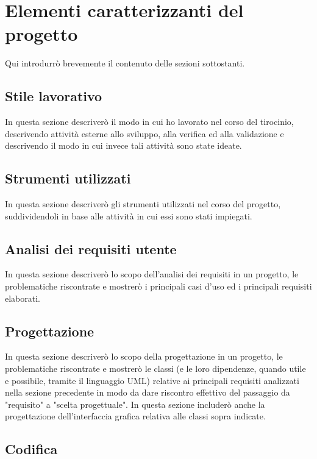 \chapter{Elementi caratterizzanti del progetto}
\label{cap:elementi-progetto}
Qui introdurrò brevemente il contenuto delle sezioni sottostanti.

\section{Stile lavorativo}

In questa sezione descriverò il modo in cui ho lavorato nel corso del tirocinio, descrivendo attività esterne allo sviluppo, alla verifica ed alla validazione e descrivendo il modo in cui invece tali attività sono state ideate.

\section{Strumenti utilizzati}

In questa sezione descriverò gli strumenti utilizzati nel corso del progetto, suddividendoli in base alle attività in cui essi sono stati impiegati.

\section{Analisi dei requisiti utente}

In questa sezione descriverò lo scopo dell'analisi dei requisiti in un progetto, le problematiche riscontrate e mostrerò i principali casi d'uso ed i principali requisiti elaborati.

\section{Progettazione}

In questa sezione descriverò lo scopo della progettazione in un progetto, le problematiche riscontrate e mostrerò le classi (e le loro dipendenze, quando utile e possibile, tramite il linguaggio UML) relative ai principali requisiti analizzati nella sezione precedente in modo da dare riscontro effettivo del passaggio da "requisito" a "scelta progettuale".
In questa sezione includerò anche la progettazione dell'interfaccia grafica relativa alle classi sopra indicate.

\section{Codifica}

